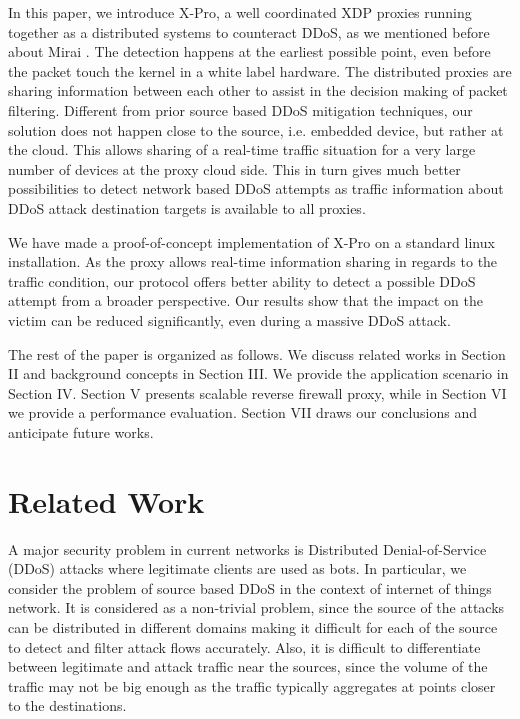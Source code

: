 \documentclass[sigplan,screen]{acmart}
\begin{document}
In this paper, we introduce X-Pro, a well coordinated XDP proxies running together as a distributed systems to counteract DDoS, as we mentioned before about Mirai \cite{203628}. The detection happens at the earliest possible point, even before the packet touch the kernel in a white label hardware. The distributed proxies are sharing information between each other to assist in the decision making of packet filtering.  Different from prior source based DDoS mitigation techniques, our solution does not happen close to the source, i.e. embedded device, but rather at the cloud. This allows sharing of a real-time traffic situation for a very large number of devices at the proxy cloud side. This in turn gives much better possibilities to detect network based DDoS attempts as traffic information about DDoS attack destination targets is available to all proxies.

We have made a proof-of-concept implementation of X-Pro on a standard linux installation. As the proxy allows real-time information sharing in regards to the traffic condition, our protocol offers better ability to detect a possible DDoS attempt from a broader perspective. Our results show that the impact on the victim can be reduced significantly, even during a massive DDoS attack.

The rest of the paper is organized as follows. We discuss related works in Section II and background concepts in Section III. We provide the application scenario in Section IV. Section V presents scalable reverse firewall proxy, while in Section VI we provide a performance evaluation. Section VII draws our conclusions and anticipate future works.

\section{Related Work}
A major security problem in current networks is Distributed Denial-of-Service (DDoS) attacks where legitimate clients are used as bots. In particular, we consider the problem of source based DDoS in the context of internet of things network. It is considered as a non-trivial problem, since the source of the attacks can be distributed in different domains making it difficult for each of the source to detect and filter attack flows accurately. Also, it is difficult to differentiate between legitimate and attack traffic near the sources, since the volume of the traffic may not be big enough as the traffic typically aggregates at points closer to the destinations.
\end{document}
